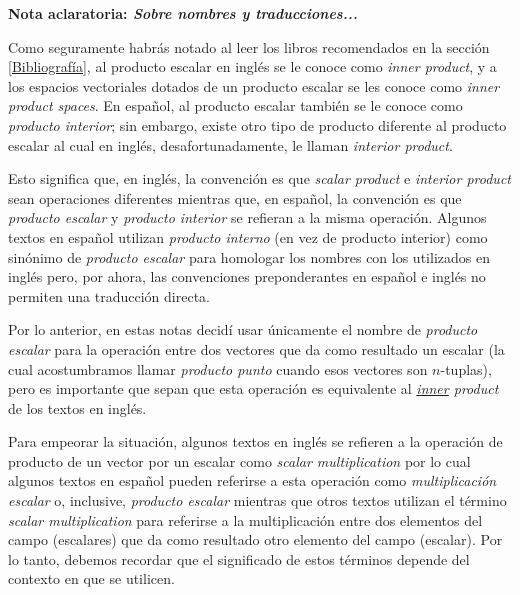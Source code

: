 \documentclass[12pt]{article}
\begin{document}
\begin{tcolorbox}
\begin{center}
    \textbf{Nota aclaratoria: \emph{Sobre nombres y traducciones...}}
\end{center}

\hspace{2.5mm}Como seguramente habrás notado al leer los libros recomendados en la sección \ref{Bibliografía}, al producto escalar en inglés se le conoce como \emph{inner product}, y a los espacios vectoriales dotados de un producto escalar se les conoce como \emph{inner product spaces}. En español, al producto escalar también se le conoce como \emph{producto interior}; sin embargo, existe otro tipo de producto diferente al producto escalar al cual en inglés, desafortunadamente, le llaman \emph{interior product}.

\hspace{2.5mm}Esto significa que, en inglés, la convención es que \emph{scalar product} e \emph{interior product} sean operaciones diferentes mientras que, en español, la convención es que \emph{producto escalar} y \emph{producto interior} se refieran a la misma operación. Algunos textos en español utilizan \emph{producto interno} (en vez de producto interior) como sinónimo de \emph{producto escalar} para homologar los nombres con los utilizados en inglés pero, por ahora, las convenciones preponderantes en español e inglés no permiten una traducción directa.

\hspace{2.5mm}Por lo anterior, en estas notas decidí usar únicamente el nombre de \emph{producto escalar} para la operación entre dos vectores que da como resultado un escalar (la cual acostumbramos llamar \emph{producto punto} cuando esos vectores son $n$-tuplas), pero es importante que sepan que esta operación es equivalente al \emph{\underline{inner} product} de los textos en inglés.

    \hspace{2.5mm} Para empeorar la situación, algunos textos en inglés se refieren a la operación de producto de un vector por un escalar como \emph{scalar multiplication} \textemdash por lo cual algunos textos en español pueden referirse a esta operación como \emph{multiplicación escalar} o, inclusive, \emph{producto escalar}\textemdash \hspace{0.5mm} mientras que otros textos utilizan el término \emph{scalar multiplication} para referirse a la multiplicación entre dos elementos del campo (escalares) que da como resultado otro elemento del campo (escalar). Por lo tanto, debemos recordar que el significado de estos términos depende del contexto en que se utilicen. 


\end{tcolorbox}
\end{document}
